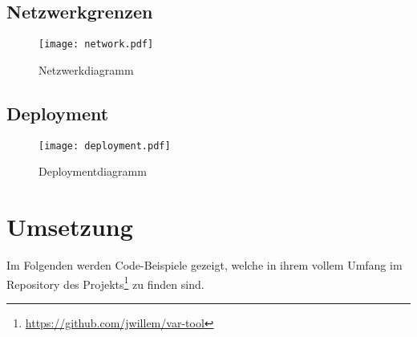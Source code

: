 \subsection{Netzwerkgrenzen}
  \begin{figure}[h]
    \centering
    \texttt{[image: network.pdf]}
    \par
    \caption{Netzwerkdiagramm}
    \label{fig:network}
  \end{figure}

\subsection{Deployment}
\begin{landscape}
  \begin{figure}[h]
    \centering
    \texttt{[image: deployment.pdf]}
    \par
    \caption{Deploymentdiagramm}
    \label{fig:deployment}
  \end{figure}
\end{landscape}
\section{Umsetzung}
Im Folgenden werden Code-Beispiele gezeigt, welche in ihrem vollem Umfang im Repository des Projekts\footnote{\url{https://github.com/jwillem/var-tool}} zu finden sind.
